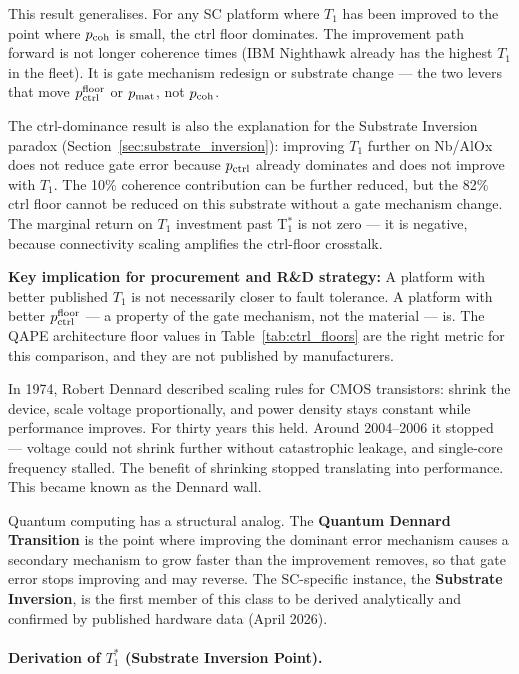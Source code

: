 \documentclass[12pt,a4paper]{article}
\begin{document}
This result generalises. For any SC platform where $T_1$ has been improved
to the point where $p_{\rm coh}$ is small, the ctrl floor dominates.
The improvement path forward is not longer coherence times (IBM Nighthawk
already has the highest $T_1$ in the fleet). It is gate mechanism redesign
or substrate change --- the two levers that move $p_{\rm ctrl}^{\rm floor}$
or $p_{\rm mat}$, not $p_{\rm coh}$.

The ctrl-dominance result is also the explanation for the Substrate Inversion
paradox (Section~\ref{sec:substrate_inversion}): improving $T_1$ further on
Nb/AlOx does not reduce gate error because $p_{\rm ctrl}$ already dominates
and does not improve with $T_1$. The 10\% coherence contribution can be
further reduced, but the 82\% ctrl floor cannot be reduced on this substrate
without a gate mechanism change. The marginal return on $T_1$ investment
past T$_1^*$ is not zero --- it is negative, because connectivity scaling
amplifies the ctrl-floor crosstalk.

\textbf{Key implication for procurement and R\&D strategy:}
A platform with better published $T_1$ is not necessarily closer to fault
tolerance. A platform with better $p_{\rm ctrl}^{\rm floor}$ --- a property
of the gate mechanism, not the material --- is. The QAPE architecture floor
values in Table~\ref{tab:ctrl_floors} are the right metric for this comparison,
and they are not published by manufacturers.


\label{sec:substrate_inversion}

In 1974, Robert Dennard described scaling rules for CMOS transistors: shrink
the device, scale voltage proportionally, and power density stays constant
while performance improves. For thirty years this held. Around 2004--2006 it
stopped --- voltage could not shrink further without catastrophic leakage, and
single-core frequency stalled. The benefit of shrinking stopped translating
into performance. This became known as the Dennard wall.

Quantum computing has a structural analog. The \textbf{Quantum Dennard
Transition} is the point where improving the dominant error mechanism causes
a secondary mechanism to grow faster than the improvement removes, so that
gate error stops improving and may reverse. The SC-specific instance, the
\textbf{Substrate Inversion}, is the first member of this class to be derived
analytically and confirmed by published hardware data (April 2026).

\paragraph{Derivation of $T_1^*$ (Substrate Inversion Point).}
\end{document}
